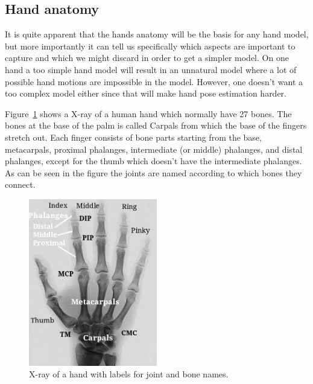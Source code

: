 \documentclass[a4paper,11pt]{kth-mag}
\begin{document}
\subsection{Hand anatomy}
It is quite apparent that the hands anatomy will be the basis for any hand model, but more importantly it can tell us specifically which aspects are important to capture and which we might discard in order to get a simpler model.
On one hand a too simple hand model will result in an unnatural model where a lot of possible hand motions are impossible in the model.
However, one doesn't want a too complex model either since that will make hand pose estimation harder.

Figure~\ref{fig:hand} shows a X-ray of a human hand which normally have 27 bones\cite{anatomy}. 
The bones at the base of the palm is called Carpals from which the base of the fingers stretch out.
Each finger consists of bone parts starting from the base, metacarpals, proximal phalanges, intermediate (or middle) phalanges, and distal phalanges, except for the thumb which doesn't have the intermediate phalanges.
As can be seen in the figure the joints are named according to which bones they connect.

\begin{figure}[!ht]
    \centering
    \includegraphics[width=0.5\textwidth]{images/handskeletone/labeledSkeletone.png}
    \caption{X-ray of a hand with labels for joint and bone names.}
    \label{fig:hand}
\end{figure}
\end{document}
